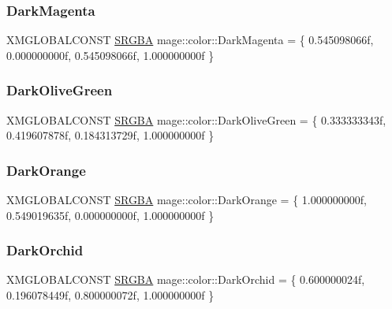 \hypertarget{namespacemage_1_1color_aa62226b72ae58ea0ff91983dab110de9}{}\label{namespacemage_1_1color_aa62226b72ae58ea0ff91983dab110de9} 
\subsubsection{\texorpdfstring{Dark\+Magenta}{DarkMagenta}}
{\footnotesize\ttfamily X\+M\+G\+L\+O\+B\+A\+L\+C\+O\+N\+ST \hyperlink{structmage_1_1_s_r_g_b_a}{S\+R\+G\+BA} mage\+::color\+::\+Dark\+Magenta = \{ 0.\+545098066f, 0.\+000000000f, 0.\+545098066f, 1.\+000000000f \}}

\hypertarget{namespacemage_1_1color_a6776b45c4cae8936bb265170076396fa}{}\label{namespacemage_1_1color_a6776b45c4cae8936bb265170076396fa} 
\subsubsection{\texorpdfstring{Dark\+Olive\+Green}{DarkOliveGreen}}
{\footnotesize\ttfamily X\+M\+G\+L\+O\+B\+A\+L\+C\+O\+N\+ST \hyperlink{structmage_1_1_s_r_g_b_a}{S\+R\+G\+BA} mage\+::color\+::\+Dark\+Olive\+Green = \{ 0.\+333333343f, 0.\+419607878f, 0.\+184313729f, 1.\+000000000f \}}

\hypertarget{namespacemage_1_1color_ada422983b2e1f8c60e4c32ca95f6f985}{}\label{namespacemage_1_1color_ada422983b2e1f8c60e4c32ca95f6f985} 
\subsubsection{\texorpdfstring{Dark\+Orange}{DarkOrange}}
{\footnotesize\ttfamily X\+M\+G\+L\+O\+B\+A\+L\+C\+O\+N\+ST \hyperlink{structmage_1_1_s_r_g_b_a}{S\+R\+G\+BA} mage\+::color\+::\+Dark\+Orange = \{ 1.\+000000000f, 0.\+549019635f, 0.\+000000000f, 1.\+000000000f \}}

\hypertarget{namespacemage_1_1color_abeffe327a3acdb1e4e1d1105ac4c19bf}{}\label{namespacemage_1_1color_abeffe327a3acdb1e4e1d1105ac4c19bf} 
\subsubsection{\texorpdfstring{Dark\+Orchid}{DarkOrchid}}
{\footnotesize\ttfamily X\+M\+G\+L\+O\+B\+A\+L\+C\+O\+N\+ST \hyperlink{structmage_1_1_s_r_g_b_a}{S\+R\+G\+BA} mage\+::color\+::\+Dark\+Orchid = \{ 0.\+600000024f, 0.\+196078449f, 0.\+800000072f, 1.\+000000000f \}}

